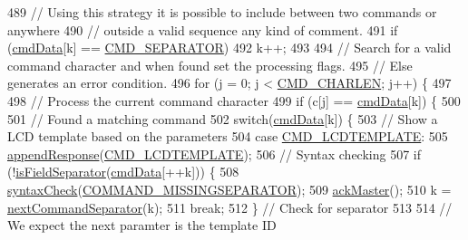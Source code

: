 \begin{DoxyCode}
\begin{DoxyCode}
\begin{DoxyCode}
\begin{DoxyCode}
489     \textcolor{comment}{// Using this strategy it is possible to include between two commands or anywhere}
490     \textcolor{comment}{// outside a valid sequence any kind of comment.}
491     \textcolor{keywordflow}{if} (\hyperlink{_meditech___chip_kit_control_panel_8pde_afd31a444e0380e6be247c64cdb1510a9}{cmdData}[k] == \hyperlink{_command_processor_8h_aa3115116a4036d93c8c91cf7e0f13c70}{CMD\_SEPARATOR})
492       k++;
493 
494     \textcolor{comment}{// Search for a valid command character and when found set the processing flags.}
495     \textcolor{comment}{// Else generates an error condition. }
496     \textcolor{keywordflow}{for} (j = 0; j < \hyperlink{_command_processor_8h_a91c8743332ff637bc271733a535f31e7}{CMD\_CHARLEN}; j++) \{
497       
498       \textcolor{comment}{// Process the current command character}
499       \textcolor{keywordflow}{if} (c[j] == \hyperlink{_meditech___chip_kit_control_panel_8pde_afd31a444e0380e6be247c64cdb1510a9}{cmdData}[k]) \{
500         
501         \textcolor{comment}{// Found a matching command}
502         \textcolor{keywordflow}{switch}(\hyperlink{_meditech___chip_kit_control_panel_8pde_afd31a444e0380e6be247c64cdb1510a9}{cmdData}[k]) \{
503           \textcolor{comment}{// Show a LCD template based on the parameters}
504           \textcolor{keywordflow}{case} \hyperlink{_command_processor_8h_acd6dc9f192384457eca2de560b24e112}{CMD\_LCDTEMPLATE}:
505             \hyperlink{_meditech___chip_kit_control_panel_8pde_afffcc2cca703b7a4d76c7f2dedd7266d}{appendResponse}(\hyperlink{_command_processor_8h_acd6dc9f192384457eca2de560b24e112}{CMD\_LCDTEMPLATE});
506             \textcolor{comment}{// Syntax checking}
507             \textcolor{keywordflow}{if} (!\hyperlink{_meditech___chip_kit_control_panel_8pde_a5e204e0bba8ab8ee2bde88215bf2ee53}{isFieldSeparator}(\hyperlink{_meditech___chip_kit_control_panel_8pde_afd31a444e0380e6be247c64cdb1510a9}{cmdData}[++k])) \{
508               \hyperlink{_meditech___chip_kit_control_panel_8pde_a586164a6eff90eab6ba87a6ca123770d}{syntaxCheck}(\hyperlink{_parser_errors_8h_af1641bf12003024ece5012a639004d5c}{COMMAND\_MISSINGSEPARATOR});
509               \hyperlink{_meditech___chip_kit_control_panel_8pde_a4e435af9ec30d668c4cff6a97baa8e5a}{ackMaster}();
510               k = \hyperlink{_meditech___chip_kit_control_panel_8pde_a4b62bbf3dd6cf7eb7fee557932fd1b7c}{nextCommandSeparator}(k);
511               \textcolor{keywordflow}{break};
512             \} \textcolor{comment}{// Check for separator}
513             
514             \textcolor{comment}{// We expect the next paramter is the template ID}

\end{DoxyCode}
\end{DoxyCode}
\end{DoxyCode}
\end{DoxyCode}
